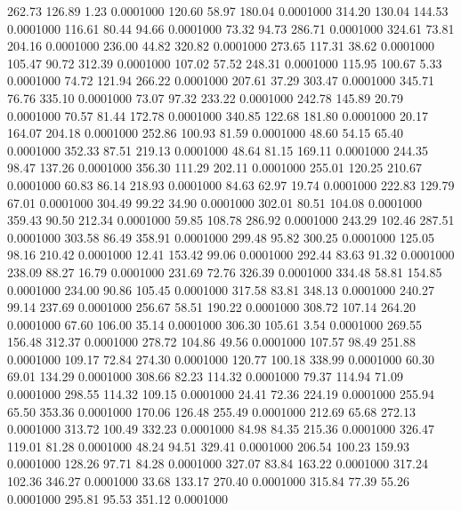  262.73  126.89    1.23   0.0001000
 120.60   58.97  180.04   0.0001000
 314.20  130.04  144.53   0.0001000
 116.61   80.44   94.66   0.0001000
  73.32   94.73  286.71   0.0001000
 324.61   73.81  204.16   0.0001000
 236.00   44.82  320.82   0.0001000
 273.65  117.31   38.62   0.0001000
 105.47   90.72  312.39   0.0001000
 107.02   57.52  248.31   0.0001000
 115.95  100.67    5.33   0.0001000
  74.72  121.94  266.22   0.0001000
 207.61   37.29  303.47   0.0001000
 345.71   76.76  335.10   0.0001000
  73.07   97.32  233.22   0.0001000
 242.78  145.89   20.79   0.0001000
  70.57   81.44  172.78   0.0001000
 340.85  122.68  181.80   0.0001000
  20.17  164.07  204.18   0.0001000
 252.86  100.93   81.59   0.0001000
  48.60   54.15   65.40   0.0001000
 352.33   87.51  219.13   0.0001000
  48.64   81.15  169.11   0.0001000
 244.35   98.47  137.26   0.0001000
 356.30  111.29  202.11   0.0001000
 255.01  120.25  210.67   0.0001000
  60.83   86.14  218.93   0.0001000
  84.63   62.97   19.74   0.0001000
 222.83  129.79   67.01   0.0001000
 304.49   99.22   34.90   0.0001000
 302.01   80.51  104.08   0.0001000
 359.43   90.50  212.34   0.0001000
  59.85  108.78  286.92   0.0001000
 243.29  102.46  287.51   0.0001000
 303.58   86.49  358.91   0.0001000
 299.48   95.82  300.25   0.0001000
 125.05   98.16  210.42   0.0001000
  12.41  153.42   99.06   0.0001000
 292.44   83.63   91.32   0.0001000
 238.09   88.27   16.79   0.0001000
 231.69   72.76  326.39   0.0001000
 334.48   58.81  154.85   0.0001000
 234.00   90.86  105.45   0.0001000
 317.58   83.81  348.13   0.0001000
 240.27   99.14  237.69   0.0001000
 256.67   58.51  190.22   0.0001000
 308.72  107.14  264.20   0.0001000
  67.60  106.00   35.14   0.0001000
 306.30  105.61    3.54   0.0001000
 269.55  156.48  312.37   0.0001000
 278.72  104.86   49.56   0.0001000
 107.57   98.49  251.88   0.0001000
 109.17   72.84  274.30   0.0001000
 120.77  100.18  338.99   0.0001000
  60.30   69.01  134.29   0.0001000
 308.66   82.23  114.32   0.0001000
  79.37  114.94   71.09   0.0001000
 298.55  114.32  109.15   0.0001000
  24.41   72.36  224.19   0.0001000
 255.94   65.50  353.36   0.0001000
 170.06  126.48  255.49   0.0001000
 212.69   65.68  272.13   0.0001000
 313.72  100.49  332.23   0.0001000
  84.98   84.35  215.36   0.0001000
 326.47  119.01   81.28   0.0001000
  48.24   94.51  329.41   0.0001000
 206.54  100.23  159.93   0.0001000
 128.26   97.71   84.28   0.0001000
 327.07   83.84  163.22   0.0001000
 317.24  102.36  346.27   0.0001000
  33.68  133.17  270.40   0.0001000
 315.84   77.39   55.26   0.0001000
 295.81   95.53  351.12   0.0001000
